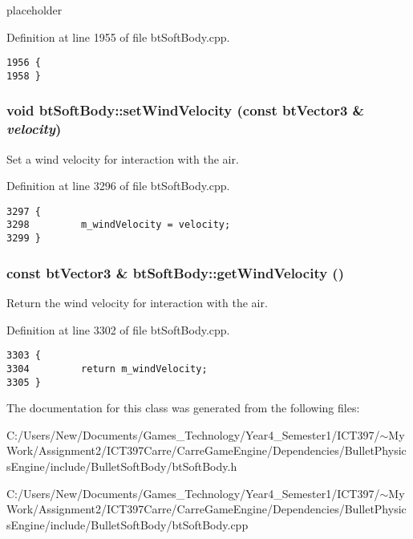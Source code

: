 placeholder 

Definition at line 1955 of file btSoftBody.cpp.

\begin{Code}\begin{verbatim}1956 {
1958 }
\end{verbatim}
\end{Code}


\hypertarget{classbt_soft_body_ee9ac69662731fa96ae2357522972ef9}{
\subsubsection[setWindVelocity]{\setlength{\rightskip}{0pt plus 5cm}void btSoftBody::setWindVelocity (const btVector3 \& {\em velocity})}}
\label{classbt_soft_body_ee9ac69662731fa96ae2357522972ef9}


Set a wind velocity for interaction with the air. 

Definition at line 3296 of file btSoftBody.cpp.

\begin{Code}\begin{verbatim}3297 {
3298         m_windVelocity = velocity;
3299 }
\end{verbatim}
\end{Code}


\hypertarget{classbt_soft_body_71de05c3c56952a4d76e09ca9ca9cce0}{
\subsubsection[getWindVelocity]{\setlength{\rightskip}{0pt plus 5cm}const btVector3 \& btSoftBody::getWindVelocity ()}}
\label{classbt_soft_body_71de05c3c56952a4d76e09ca9ca9cce0}


Return the wind velocity for interaction with the air. 

Definition at line 3302 of file btSoftBody.cpp.

\begin{Code}\begin{verbatim}3303 {
3304         return m_windVelocity;
3305 }
\end{verbatim}
\end{Code}




The documentation for this class was generated from the following files:\begin{CompactItemize}
\item 
C:/Users/New/Documents/Games\_\-Technology/Year4\_\-Semester1/ICT397/$\sim$My Work/Assignment2/ICT397Carre/CarreGameEngine/Dependencies/BulletPhysicsEngine/include/BulletSoftBody/btSoftBody.h\item 
C:/Users/New/Documents/Games\_\-Technology/Year4\_\-Semester1/ICT397/$\sim$My Work/Assignment2/ICT397Carre/CarreGameEngine/Dependencies/BulletPhysicsEngine/include/BulletSoftBody/btSoftBody.cpp\end{CompactItemize}
